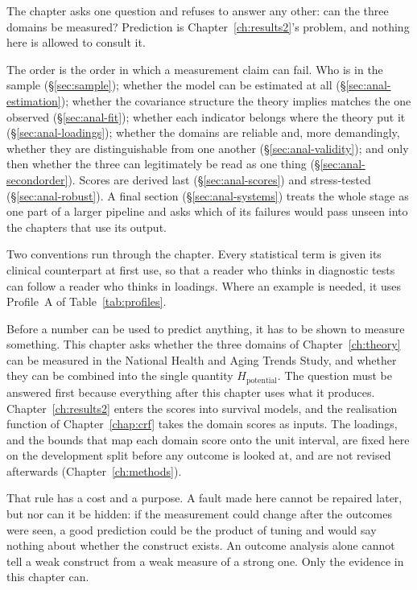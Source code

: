 
\label{ch:results1}

\begin{ataglance}
The chapter asks one question and refuses to answer any other: can the three
domains be measured? Prediction is Chapter~\ref{ch:results2}'s problem, and
nothing here is allowed to consult it.

The order is the order in which a measurement claim can fail. Who is in the
sample (\S\ref{sec:sample}); whether the model can be estimated at all
(\S\ref{sec:anal-estimation}); whether the covariance structure the theory
implies matches the one observed (\S\ref{sec:anal-fit}); whether each indicator
belongs where the theory put it (\S\ref{sec:anal-loadings}); whether the
domains are reliable and, more demandingly, whether they are distinguishable
from one another (\S\ref{sec:anal-validity}); and only then whether the three
can legitimately be read as one thing (\S\ref{sec:anal-secondorder}). Scores
are derived last (\S\ref{sec:anal-scores}) and stress-tested
(\S\ref{sec:anal-robust}). A final section (\S\ref{sec:anal-systems}) treats
the whole stage as one part of a larger pipeline and asks which of its
failures would pass unseen into the chapters that use its output.

Two conventions run through the chapter. Every statistical term is given its
clinical counterpart at first use, so that a reader who thinks in diagnostic
tests can follow a reader who thinks in loadings. Where an example is needed,
it uses Profile~A of Table~\ref{tab:profiles}.
\end{ataglance}

Before a number can be used to predict anything, it has to be shown to measure something. This chapter asks whether the three domains of Chapter~\ref{ch:theory} can be measured in the National Health and Aging Trends Study, and whether they can be combined into the single quantity $H_{\text{potential}}$. The question must be answered first because everything after this chapter uses what it produces. Chapter~\ref{ch:results2} enters the scores into survival models, and the realisation function of Chapter~\ref{chap:crf} takes the domain scores as inputs. The loadings, and the bounds that map each domain score onto the unit interval, are fixed here on the development split before any outcome is looked at, and are not revised afterwards (Chapter~\ref{ch:methods}).

That rule has a cost and a purpose. A fault made here cannot be repaired later, but nor can it be hidden: if the measurement could change after the outcomes were seen, a good prediction could be the product of tuning and would say nothing about whether the construct exists. An outcome analysis alone cannot tell a weak construct from a weak measure of a strong one. Only the evidence in this chapter can.

